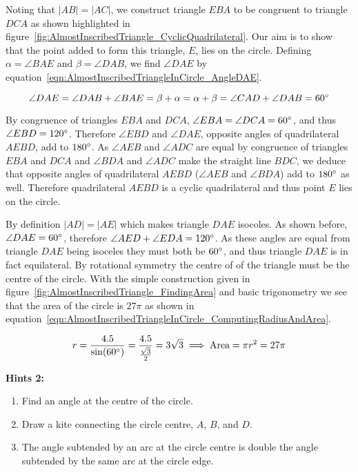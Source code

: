 Noting that $|AB| = |AC|$, we construct triangle $EBA$ to be congruent to triangle $DCA$ as shown highlighted in figure~\ref{fig:AlmostInscribedTriangle_CyclicQuadrilateral}. Our aim is to show that the point added to form this triangle, $E$, lies on the circle. Defining $\alpha = \angle BAE$ and $\beta = \angle DAB$, we find $\angle DAE$ by equation~\eqref{eqn:AlmostInscribedTriangleInCircle_AngleDAE}.

\begin{equation}
	\angle DAE = \angle DAB + \angle BAE = \beta + \alpha = \alpha + \beta = \angle CAD + \angle DAB = 60\degree
	\label{eqn:AlmostInscribedTriangleInCircle_AngleDAE}
\end{equation}

By congruence of triangles $EBA$ and $DCA$, $\angle EBA = \angle DCA = 60\degree$, and thus $\angle EBD = 120\degree$. Therefore $\angle EBD$ and $\angle DAE$, opposite angles of quadrilateral $AEBD$, add to $180\degree$. As $\angle AEB$ and $\angle ADC$ are equal by congruence of triangles $EBA$ and $DCA$ and $\angle BDA$ and $\angle ADC$ make the straight line $BDC$, we deduce that opposite angles of quadrilateral $AEBD$ ($\angle AEB$ and $\angle BDA$) add to $180\degree$ as well. Therefore quadrilateral $AEBD$ is a cyclic quadrilateral and thus point $E$ lies on the circle.

By definition $|AD| = |AE|$ which makes triangle $DAE$ isocoles. As shown before, $\angle DAE = 60\degree$, therefore $\angle AED + \angle EDA = 120\degree$. As these angles are equal from triangle $DAE$ being isoceles they must both be $60\degree$, and thus triangle $DAE$ is in fact equilateral. By rotational symmetry the centre of of the triangle must be the centre of the circle. With the simple construction given in figure~\ref{fig:AlmostInscribedTriangle_FindingArea} and basic trigonometry we see that the area of the circle is $27\pi$ as shown in equation~\eqref{eqn:AlmostInscribedTriangleInCircle_ComputingRadiusAndArea}.

\begin{equation}
	r = \frac{4.5}{\sin(60\degree)} = \frac{4.5}{\frac{\sqrt{3}}{2}} = 3\sqrt{3} \implies \text{Area} = \pi r^2 = 27\pi
	\label{eqn:AlmostInscribedTriangleInCircle_ComputingRadiusAndArea}
\end{equation}

\textbf{Hints 2:}

\begin{enumerate}
	\item Find an angle at the centre of the circle.
	\item Draw a kite connecting the circle centre, $A$, $B$, and $D$.
	\item The angle subtended by an arc at the circle centre is double the angle subtended by the same arc at the circle edge.
\end{enumerate}

